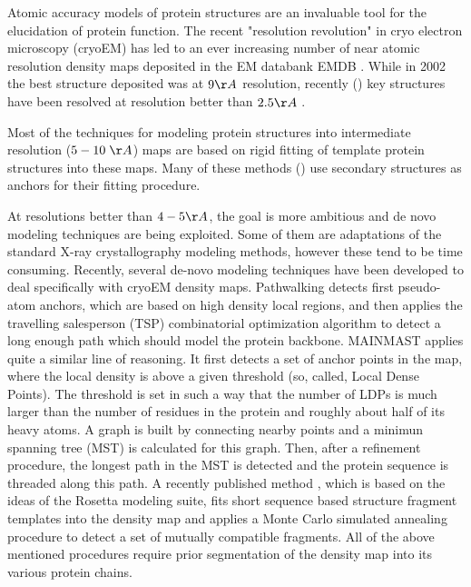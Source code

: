 Atomic accuracy models of protein structures are an invaluable tool for the elucidation of protein function.  The recent "resolution revolution" \cite{kuhlbrandt2014resolution} in cryo electron microscopy (cryoEM) has led to an ever increasing number of near atomic resolution density maps deposited in the EM databank EMDB \cite{Lawson2016EMDataBank3DEM}.  While in 2002 the best structure deposited was at $9 \AA$ resolution, recently (\cite{Bartesaghi20152.2Inhibitor,Banerjee20162.3Inhibition}) key structures have been resolved at resolution better than $2.5 \AA$ .

Most of the techniques for modeling protein structures into intermediate resolution ($5 - 10 \;\AA$) maps are based on rigid fitting of template protein structures into these maps.  Many of these methods (\cite{Jiang2001,lasker2007ematch,Yu2008,Rusu2012,Si2012}) use secondary structures as anchors for their fitting procedure. 

At resolutions better than $4-5 \AA$, the goal is more ambitious and de novo modeling techniques are being exploited. Some of them are adaptations of the standard X-ray crystallography modeling methods, however these tend to be time consuming. Recently, several de-novo modeling techniques have been developed to deal specifically with cryoEM density maps\cite{DiMaio2016}.  Pathwalking \cite{Chen2016} detects first pseudo-atom anchors, which are based on high density local regions, and then applies the travelling salesperson (TSP) combinatorial optimization algorithm to detect a long enough path which should model the protein backbone. MAINMAST \cite{Terashi2018} applies quite a similar line of reasoning. It first detects a set of anchor points in the map, where the local density is above a given threshold (so, called, Local Dense Points).  The threshold is set in such a way that the number of LDPs is much larger than the number of residues in the protein and roughly about half of its heavy atoms.  A graph is built by connecting nearby points and a minimun spanning tree (MST) is calculated for this graph.  Then, after a refinement procedure, the longest path in the MST is detected and the protein sequence is threaded along this path.   A recently published method \cite{wang2015novo}, which is based on the ideas of the Rosetta modeling suite, fits short sequence based structure fragment templates into the density map and applies a Monte Carlo simulated annealing procedure to detect a set of mutually compatible fragments.  All of the above mentioned procedures require prior segmentation of the density map into its various protein chains.

